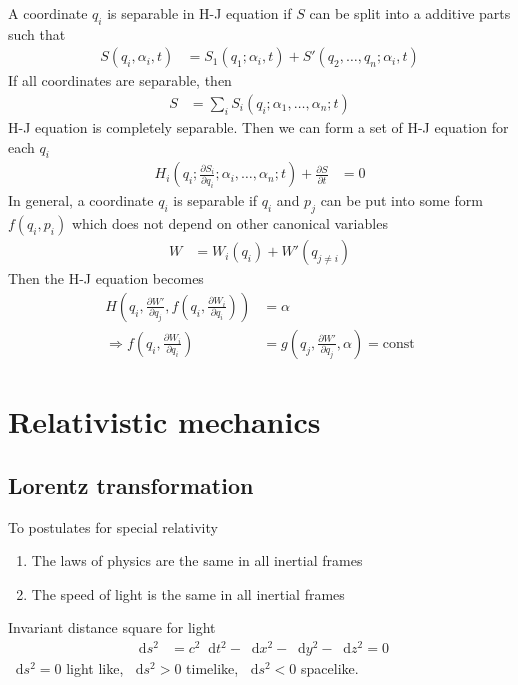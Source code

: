 \documentclass[twoside,9pt]{article}
\numberwithin{equation}{section} %
\renewcommand*\d{\mathop{}\!\mathrm{d}}
\theoremstyle{definition}
\theoremstyle{remark}
\begin{document}
A coordinate $q_i$ is separable in H-J equation if $S$ can be split into a 
additive parts such that
\begin{align}
    S(q_i, \alpha_i, t) &= S_1(q_1; \alpha_i, t) +
    S'(q_2,\dots, q_n; \alpha_i, t)
\end{align}
If all coordinates are separable, then
\begin{align}
    S &= \sum_i S_i(q_i; \alpha_1, \dots, \alpha_n; t)
\end{align}
H-J equation is completely separable.
Then we can form a set of H-J equation for each $q_i$
\begin{align}
    H_i\left( q_i; \frac{\partial S_i}{\partial q_i}; \alpha_i,\dots,\alpha_n; t \right)
    + \frac{\partial S}{\partial t} &= 0
\end{align}
In general, a coordinate $q_i$ is separable if $q_i$ and $p_j$ can be put into
some form $f(q_i, p_i)$ which does not depend on other canonical variables
\begin{align}
    W &= W_i(q_i) + W'(q_{j\neq i})
\end{align}
Then the H-J equation becomes
\begin{align}
    H\left(q_i, \frac{\partial W'}{\partial q_j}, 
    f(q_i, \frac{\partial W_i}{\partial q_i})\right) &= \alpha\\
    \Rightarrow f\left( q_i, \frac{\partial W_i}{\partial q_i} \right)
    &= g\left( q_j, \frac{\partial W'}{\partial q_j}, \alpha \right)
    = \text{const}
\end{align}


\newpage
\section{Relativistic mechanics}
\subsection{Lorentz transformation}
To postulates for special relativity
\begin{enumerate}
    \item The laws of physics are the same in all inertial frames
    \item The speed of light is the same in all inertial frames
\end{enumerate}
Invariant distance square for light
\begin{align}
    \d s^2 &= c^2\d t^2 - \d x^2 - \d y^2 - \d z^2 = 0
\end{align}
$\d s^2 = 0$ light like, $\d s^2 > 0$ timelike, $\d s^2 < 0$ spacelike.
\end{document}
